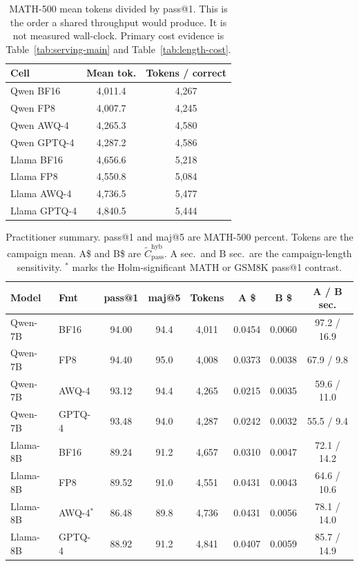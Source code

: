 \documentclass[11pt,a4paper]{article}
\begin{document}
\begin{table}[!htbp]
\centering
\caption{MATH-500 mean tokens divided by pass@1. This is the order a shared throughput would produce. It is not measured wall-clock. Primary cost evidence is Table~\ref{tab:serving-main} and Table~\ref{tab:length-cost}.}
\label{tab:economics}
\small
\begin{tabular}{lcc}
\toprule
\textbf{Cell} & \textbf{Mean tok.} & \textbf{Tokens / correct} \\
\midrule
Qwen BF16   & 4{,}011.4 & 4{,}267 \\
Qwen FP8    & 4{,}007.7 & 4{,}245 \\
Qwen AWQ-4  & 4{,}265.3 & 4{,}580 \\
Qwen GPTQ-4 & 4{,}287.2 & 4{,}586 \\
\midrule
Llama BF16   & 4{,}656.6 & 5{,}218 \\
Llama FP8    & 4{,}550.8 & 5{,}084 \\
Llama AWQ-4  & 4{,}736.5 & 5{,}477 \\
Llama GPTQ-4 & 4{,}840.5 & 5{,}444 \\
\bottomrule
\end{tabular}
\end{table}

\begin{table}[!htbp]
\centering
\caption{Practitioner summary. pass@1 and maj@5 are MATH-500 percent. Tokens are the campaign mean. A\$ and B\$ are $\widetilde{C}_{\mathrm{pass}}^{\mathrm{hyb}}$. A sec.\ and B sec.\ are the campaign-length sensitivity. $^{*}$ marks the Holm-significant MATH or GSM8K pass@1 contrast.}
\label{tab:summary}
\small
\begin{tabular}{llcccccc}
\toprule
\textbf{Model} & \textbf{Fmt} & \textbf{pass@1} & \textbf{maj@5} & \textbf{Tokens} & \textbf{A \$} & \textbf{B \$} & \textbf{A / B sec.} \\
\midrule
Qwen-7B & BF16 & 94.00 & 94.4 & 4{,}011 & 0.0454 & 0.0060 & 97.2 / 16.9 \\
Qwen-7B & FP8 & 94.40 & 95.0 & 4{,}008 & 0.0373 & 0.0038 & 67.9 / 9.8 \\
Qwen-7B & AWQ-4 & 93.12 & 94.4 & 4{,}265 & 0.0215 & 0.0035 & 59.6 / 11.0 \\
Qwen-7B & GPTQ-4 & 93.48 & 94.0 & 4{,}287 & 0.0242 & 0.0032 & 55.5 / 9.4 \\
Llama-8B & BF16 & 89.24 & 91.2 & 4{,}657 & 0.0310 & 0.0047 & 72.1 / 14.2 \\
Llama-8B & FP8 & 89.52 & 91.0 & 4{,}551 & 0.0431 & 0.0043 & 64.6 / 10.6 \\
Llama-8B & AWQ-4$^{*}$ & 86.48 & 89.8 & 4{,}736 & 0.0431 & 0.0056 & 78.1 / 14.0 \\
Llama-8B & GPTQ-4 & 88.92 & 91.2 & 4{,}841 & 0.0407 & 0.0059 & 85.7 / 14.9 \\
\bottomrule
\end{tabular}
\end{table}
\end{document}
